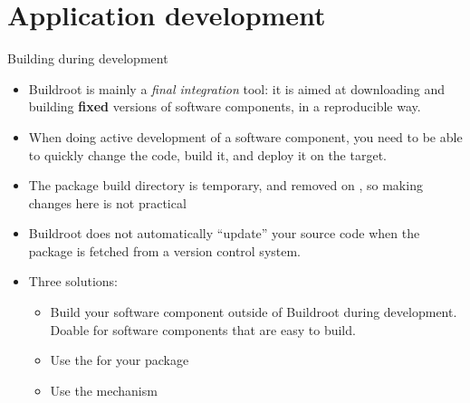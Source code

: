 
\section{Application development}

\begin{frame}{Building during development}
  \begin{itemize}
  \item Buildroot is mainly a {\em final integration} tool: it is
    aimed at downloading and building {\bf fixed} versions of software
    components, in a reproducible way.
  \item When doing active development of a software component, you
    need to be able to quickly change the code, build it, and deploy
    it on the target.
  \item The package build directory is temporary, and removed on
    , so making changes here is not practical
  \item Buildroot does not automatically ``update'' your source code
    when the package is fetched from a version control system.
  \item Three solutions:
    \begin{itemize}
    \item Build your software component outside of Buildroot during
      development. Doable for software components that are easy to
      build.
    \item Use the   for your package
    \item Use the  mechanism
    \end{itemize}
  \end{itemize}
\end{frame}

